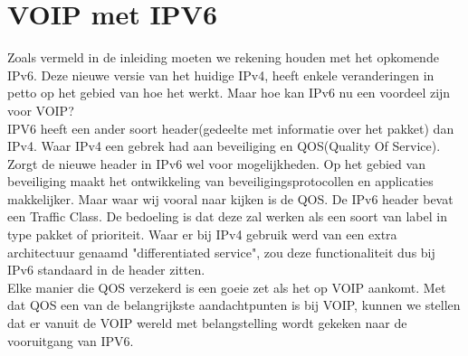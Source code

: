 \documentclass[pdftex,a4paper,12pt,twoside]{report}
\begin{document}
\chapter{VOIP met IPV6}
\label{ch:VOIP met IPV6}
Zoals vermeld in de inleiding moeten we rekening houden met het opkomende IPv6. Deze nieuwe versie van het huidige IPv4, heeft enkele veranderingen in petto op het gebied van hoe het werkt. Maar hoe kan IPv6 nu een voordeel zijn voor VOIP?\\
IPV6 heeft een ander soort header(gedeelte met informatie over het pakket) dan IPv4. Waar IPv4 een gebrek had aan beveiliging en QOS(Quality Of Service). Zorgt de nieuwe header in IPv6 wel voor mogelijkheden. Op het gebied van beveiliging maakt het ontwikkeling van beveiligingsprotocollen en applicaties makkelijker. Maar waar wij vooral naar kijken is de QOS. De IPv6 header bevat een Traffic Class. De bedoeling is dat deze zal werken als een soort van label in type pakket of prioriteit. Waar er bij IPv4 gebruik werd van een extra architectuur genaamd "differentiated service", zou deze functionaliteit dus bij IPv6 standaard in de header zitten.\\
Elke manier die QOS verzekerd is een goeie zet als het op VOIP aankomt. Met dat QOS een van de belangrijkste aandachtpunten is bij VOIP, kunnen we stellen dat er vanuit de VOIP wereld met belangstelling wordt gekeken naar de vooruitgang van IPV6.
\end{document}
